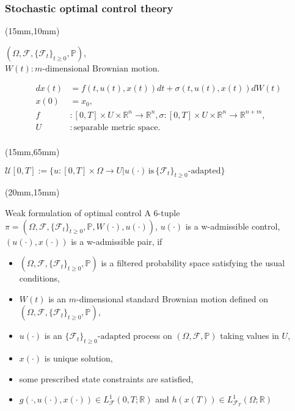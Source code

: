 \begin{frame}[plain]
	\frametitle{Stochastic optimal control theory}
	\begin{textblock*}{100mm}(15mm,10mm)
		\begin{graybox}{}
			$(\Omega,\mathscr{F},\{\mathscr{F}_t\}_{t\geq 0},\mathbb{P})$,\\ $W(t):m\text{-dimensional Brownian motion}$.
			
			\begin{align*}
				dx(t)&=
				f(t,u(t),x(t))dt+\sigma(t,u(t),x(t))dW(t)\\
				x(0)&=
				x_0,\\
				f&:
				[0,T]\times U\times\mathbb{R}^n\rightarrow\mathbb{R}^n, \sigma:[0,T]\times U\times\mathbb{R}^n\rightarrow\mathbb{R}^{n+m},\\
				U&:
				\text{separable metric space}.\\
			\end{align*}
		\end{graybox}
	\end{textblock*}

	\begin{textblock*}{100mm}(15mm,65mm)
		\begin{yellowbox}{}
			$\mathcal{U}[0,T]:=\{u:[0,T]\times\Omega\rightarrow U | u(\cdot)\,\text{is}\,\{\mathscr{F}_t\}_{t\geq 0}\text{-adapted}\}$
		\end{yellowbox}
	\end{textblock*}
\end{frame}
\begin{frame}[plain]
	\begin{textblock*}{90mm}(20mm,15mm)
		\begin{graybox}{Weak formulation of optimal control}
			 A 6-tuple $\pi=(\Omega,\mathscr{F},\{\mathscr{F}_t\}_{t\geq 0},\mathbb{P},W(\cdot),u(\cdot))$, $u(\cdot)$ is  a w-admissible control, $(u(\cdot),x(\cdot))$ is a w-admissible pair, if
			\begin{itemize}[<+->]
				\item $(\Omega,\mathscr{F},\{\mathscr{F}_t\}_{t\geq 0},\mathbb{P})$ is a filtered probability space satisfying the usual conditions,
				\item $W(t)$ is an $m$-dimensional standard Brownian motion defined on $(\Omega,\mathscr{F},\{\mathscr{F}_t\}_{t\geq 0},\mathbb{P})$,
				\item $u(\cdot)$ is an $\{\mathscr{F}_t\}_{t\geq 0}\text{-adapted}$ process on $(\Omega,\mathscr{F},\mathbb{P})$ taking values in $U$,
				\item $x(\cdot)$ is unique solution,
				\item some prescribed state constraints are satisfied,
				\item $g(\cdot,u(\cdot),x(\cdot))\in L^1_{\mathscr{F}}(0,T;\mathbb{R})$ and $h(x(T))\in L^1_{\mathscr{F}_T}(\Omega;\mathbb{R})$
			\end{itemize}
		\end{graybox}
	\end{textblock*}
\end{frame}
